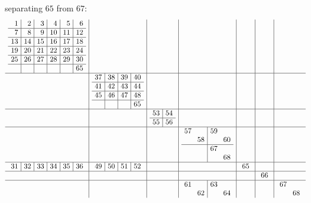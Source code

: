 \documentclass[12pt,a4paper]{amsart}
\begin{document}
\bigskip
\noindent
separating $65$ from $67$:
\begin{align*}\arraycolsep4pt
\begin{array}{c|c|c|c|c|c|c}
\begin{array}{r|r|r|r|r|r}%
1&2&3&4&5&6\\\hline%
7&8&9&10&11&12\\\hline%
13&14&15&16&17&18\\\hline%
19&20&21&22&23&24\\\hline%
25&26&27&28&29&30\\\hline%
  &  &  &  &  &65\\%
\end{array}%
&&&&&&
\\\hline
&
\begin{array}{r|r|r|r}%
37&38&39&40\\\hline%
41&42&43&44\\\hline%
45&46&47&48\\\hline%
  &  &  & 65\\%
\end{array}%
&&&&&
\\\hline
&&
\begin{array}{r|r}%
53&54\\\hline%
55&56\\%
\end{array}%
&&&&
\\\hline
&&&
\begin{array}{rr|rr}%
57&  &59&  \\%
  &58&  &60\\\hline%
  &  &67&  \\%
  &  &  &68\\%
\end{array}%
&&&
\\\hline
\begin{array}{r|r|r|r|r|r}%
31&32&33&34&35&36\\%
\end{array}%
&
\begin{array}{r|r|r|r}%
49&50&51&52\\%
\end{array}%
&&&
\begin{array}{r}%
 65\\%
\end{array}%
&&
\\\hline
&&&&&
\begin{array}{r}%
66\\%
\end{array}%
&
\\\hline
&
&&
\begin{array}{rr|rr}%
61&  &63&  \\%
  &62&  &64\\%
\end{array}%
&&&
\begin{array}{rr}%
67&  \\%
  &68\\%
\end{array}%
\end{array}
\end{align*}
\end{document}

